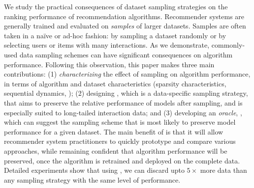 We study the practical consequences of dataset sampling strategies on the ranking performance of recommendation algorithms. Recommender systems are generally trained and evaluated on \emph{samples} of larger datasets. Samples are often taken in a na\"ive or ad-hoc fashion: \eg by sampling a dataset randomly or by selecting users or items with many interactions. As we demonstrate, commonly-used data sampling schemes can have significant consequences on algorithm performance. Following this observation, this paper makes three main contributions: (1) \emph{characterizing} the effect of sampling on algorithm performance, in terms of algorithm and dataset characteristics (\eg sparsity characteristics, sequential dynamics, \etc); (2) designing \sampler, which is a data-specific sampling strategy, that aims to preserve the relative performance of models after sampling, and is especially suited to long-tailed interaction data; and (3) developing an \emph{oracle}, \oracle, which can suggest the sampling scheme that is most likely to preserve model performance for a given dataset. The main benefit of \oracle is that it will allow recommender system practitioners to quickly prototype and compare various approaches, while remaining confident that algorithm performance will be preserved, once the algorithm is retrained and deployed on the complete data. Detailed experiments show that using \oracle, we can discard upto $5\times$ more data than any sampling strategy with the same level of performance.
